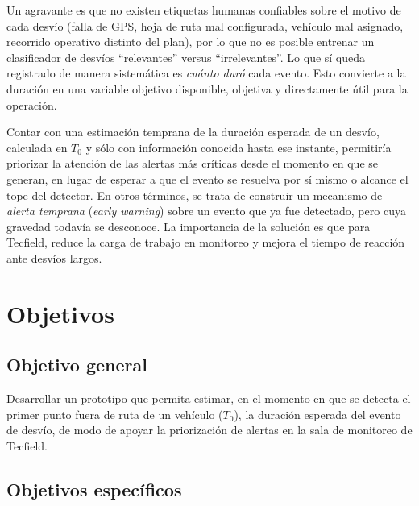 \documentclass[12pt, a4paper]{article}
\begin{document}
Un agravante es que no existen etiquetas humanas confiables sobre el motivo de
cada desvío (falla de GPS, hoja de ruta mal configurada, vehículo mal asignado,
recorrido operativo distinto del plan), por lo que no es posible entrenar un
clasificador de desvíos ``relevantes'' versus ``irrelevantes''. Lo que sí queda
registrado de manera sistemática es \emph{cuánto duró} cada evento. Esto
convierte a la duración en una variable objetivo disponible, objetiva y
directamente útil para la operación.

Contar con una estimación temprana de la duración esperada de un desvío,
calculada en $T_0$ y sólo con información conocida hasta ese instante,
permitiría priorizar la atención de las alertas más críticas desde el momento
en que se generan, en lugar de esperar a que el evento se resuelva por sí mismo
o alcance el tope del detector. En otros términos, se trata de construir un
mecanismo de \emph{alerta temprana} (\emph{early warning}) sobre un evento que
ya fue detectado, pero cuya gravedad todavía se desconoce. La importancia de la
solución es que para Tecfield, reduce la carga de trabajo en monitoreo y mejora el tiempo de reacción ante desvíos largos.

\section{Objetivos}

\subsection{Objetivo general}

Desarrollar un prototipo que permita estimar, en el momento en que se detecta
el primer punto fuera de ruta de un vehículo ($T_0$), la duración esperada del
evento de desvío, de modo de apoyar la priorización de alertas en la sala de
monitoreo de Tecfield.

\subsection{Objetivos específicos}
\end{document}

